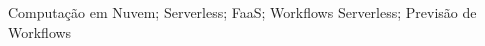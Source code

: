 \acresetall
\noindent Computação em Nuvem; Serverless; FaaS; Workflows Serverless; Previsão de Workflows